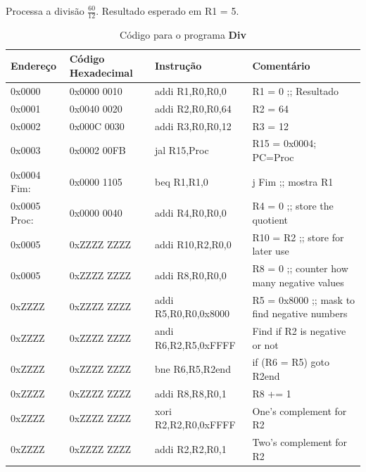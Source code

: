 \documentclass[12pt]{article}
\begin{document}
Processa a divisão $\frac{60}{12}$. Resultado esperado em R1 = 5.

\begin{table}[H]
    \centering
    \caption{Código para o programa \textbf{Div}}
    \begin{tabular}{|l|l|l|l|}\hline
        \textbf{Endereço} & \textbf{Código Hexadecimal} & \textbf{Instrução} & \textbf{Comentário} \\\hline
        0x0000         & 0x0000 0010 & addi R1,R0,R0,0      & R1 = 0 ;; Resultado                           \\\hline
        0x0001         & 0x0040 0020 & addi R2,R0,R0,64     & R2 = 64                                       \\\hline
        0x0002         & 0x000C 0030 & addi R3,R0,R0,12     & R3 = 12                                       \\\hline
        0x0003         & 0x0002 00FB & jal  R15,Proc        & R15 = 0x0004; PC=Proc                         \\\hline
        0x0004 Fim:    & 0x0000 1105 & beq  R1,R1,0         & j Fim ;; mostra R1                            \\\hline
        0x0005 Proc:   & 0x0000 0040 & addi R4,R0,R0,0      & R4 = 0 ;; store the quotient                  \\\hline
        0x0005         & 0xZZZZ ZZZZ & addi R10,R2,R0,0     & R10 = R2 ;; store for later use               \\\hline
        0x0005         & 0xZZZZ ZZZZ & addi R8,R0,R0,0      & R8 = 0 ;; counter how many negative values    \\\hline
        0xZZZZ         & 0xZZZZ ZZZZ & addi R5,R0,R0,0x8000 & R5 = 0x8000 ;; mask to find negative numbers  \\\hline
        0xZZZZ         & 0xZZZZ ZZZZ & andi R6,R2,R5,0xFFFF & Find if R2 is negative or not                 \\\hline
        0xZZZZ         & 0xZZZZ ZZZZ & bne  R6,R5,R2end     & if (R6 \!= R5) goto R2end                     \\\hline
        0xZZZZ         & 0xZZZZ ZZZZ & addi R8,R8,R0,1      & R8 += 1                                       \\\hline
        0xZZZZ         & 0xZZZZ ZZZZ & xori R2,R2,R0,0xFFFF & One's complement for R2                       \\\hline
        0xZZZZ         & 0xZZZZ ZZZZ & addi R2,R2,R0,1      & Two's complement for R2                       \\\hline

\end{tabular}
\end{table}
\end{document}
